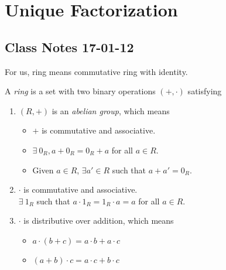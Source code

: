 \documentclass{mynotes}
\begin{document}
\tableofcontents
\chapter{Unique Factorization}
\section{Class Notes 17-01-12}
For us, ring means commutative ring with identity.
\begin{definition}
A \emph{ring} is a set with two binary operations $(+,\cdot)$ satisfying
\begin{enumerate}
\item $(R,+)$ is an \emph{abelian group}, which means
\begin{itemize}
\item $+$ is commutative and associative.
\item $\exists\ 0_R, a+0_R=0_R+a$ for all $a\in R$.
\item Given $a\in R$, $\exists a'\in R$ such that $a+a'=0_R$.
\end{itemize}
\item 
$\cdot$ is commutative and associative.\\
$\exists\ 1_R$ such that $a\cdot 1_R=1_R\cdot a =a$ for all $a\in R$.
\item $\cdot$ is distributive over addition, which means
\begin{itemize}
\item $a\cdot(b+c) = a\cdot b+a\cdot c$
\item $(a+b)\cdot c = a\cdot c +b\cdot c$
\end{itemize}
\end{enumerate}
\end{definition}
\end{document}
